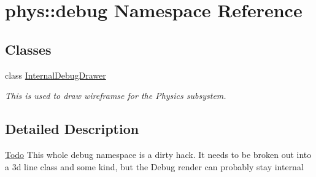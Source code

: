 \hypertarget{namespacephys_1_1debug}{
\section{phys::debug Namespace Reference}
\label{d0/d53/namespacephys_1_1debug}
}
\subsection*{Classes}
\begin{DoxyCompactItemize}
\item 
class \hyperlink{classphys_1_1debug_1_1InternalDebugDrawer}{InternalDebugDrawer}
\begin{DoxyCompactList}\small\item\em This is used to draw wireframse for the Physics subsystem. \item\end{DoxyCompactList}\end{DoxyCompactItemize}


\subsection{Detailed Description}
\begin{Desc}
\item[\hyperlink{todo__todo000013}{Todo}]This whole debug namespace is a dirty hack. It needs to be broken out into a 3d line class and some kind, but the Debug render can probably stay internal \end{Desc}
